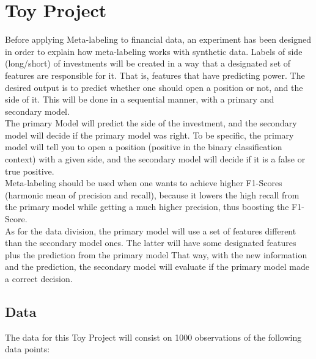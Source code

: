 \documentclass[a4paper]{article}
\begin{document}
\section{Toy Project}
\label{sec:toyProject}
Before applying Meta-labeling to financial data, an experiment has 
been designed in order to explain how meta-labeling works with 
synthetic data. Labels of side (long/short) of investments will be 
created in a way that a designated set of features are responsible for 
it. That is, features that have predicting power. The desired output 
is to predict whether one should open a position or not, and the side 
of it. This will be done in a sequential manner, with a primary and 
secondary model.\\

The primary Model will predict the side of the investment, and the 
secondary model will decide if the primary model was right. To be 
specific, the primary model will tell you to open a position (positive 
in the binary classification context) with a given side, and the 
secondary model will decide if it is a false or true positive.\\

Meta-labeling should be used when one wants to achieve higher 
F1-Scores (harmonic mean of precision and recall), because it lowers 
the high recall from the primary model while getting a much higher 
precision, thus boosting the F1-Score.\\

As for the data division, the primary model will use a set of features 
different than the secondary model ones. The latter will have some 
designated features plus the prediction from the primary model That 
way, with the new information and the prediction, the secondary model 
will evaluate if the primary model made a correct decision.

\subsection{Data}
The data for this Toy Project will consist on 1000 observations of the 
following data points:
\end{document}
